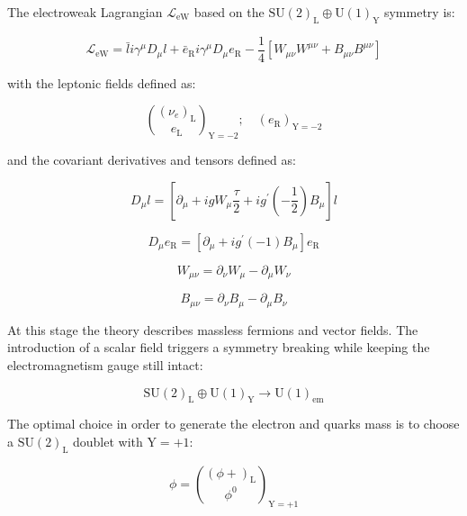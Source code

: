 The electroweak Lagrangian $\mathcal{L}_{\text{eW}}$ based on the $\text{SU}(2)_{\text{L}} \oplus \text{U}(1)_{\text{Y}}$ symmetry is:

\begin{equation}
\mathcal{L}_{\text{eW}} = \bar{l}i\gamma^{\mu} D_{\mu}l + \bar{e}_{\text{R}}i\gamma^{\mu}D_{\mu}e_{\text{R}} - \dfrac{1}{4}[W_{\mu\nu}W^{\mu\nu} +B_{\mu\nu}B^{\mu\nu}]
\label{eq::lagrangian_ew}
\end{equation}

with the leptonic fields defined as:

\begin{equation}
\binom{(\nu_{e})_{\text{L}}}{e_{\text{L}}}_{\text{Y}=−2} ; \quad (e_{\text{R}})_{\text{Y}=−2}
\label{eq::fields_scheme}
\end{equation}

and the covariant derivatives and tensors defined as:

\begin{equation}
D_{\mu}l = [\partial_{\mu} + igW_{\mu} \dfrac{\tau}{2}  + ig^{\prime}(-\dfrac{1}{2})B_{\mu}]l 
\end{equation}

\begin{equation}
D_{\mu}e_{\text{R}} = [\partial_{\mu} + ig^{\prime}(-1)B_{\mu}]e_{\text{R}}
\end{equation}

\begin{equation}
W_{\mu\nu} =\partial_{\nu}W_{\mu} - \partial_{\mu}W_{\nu} 
\end{equation}

\begin{equation}
B_{\mu\nu} =\partial_{\nu}B_{\mu} - \partial_{\mu}B_{\nu} 
\end{equation}

At this stage the theory describes massless fermions and vector fields. The introduction of a scalar field triggers a symmetry breaking while keeping the electromagnetism gauge still intact:

\begin{equation}
\text{SU}(2)_{\text{L}} \oplus \text{U}(1)_{\text{Y}} \rightarrow \text{U}(1)_{\text{em}}
\end{equation}

The optimal choice in order to generate the electron and quarks mass is to choose a $\text{SU}(2)_{\text{L}}$ doublet with $\text{Y} = +1$: 

\begin{equation}
\phi = \binom{(\phi{+})_{\text{L}}}{\phi^{0}}_{\text{Y}=+1}
\label{eq::su2_doublet}
\end{equation}

